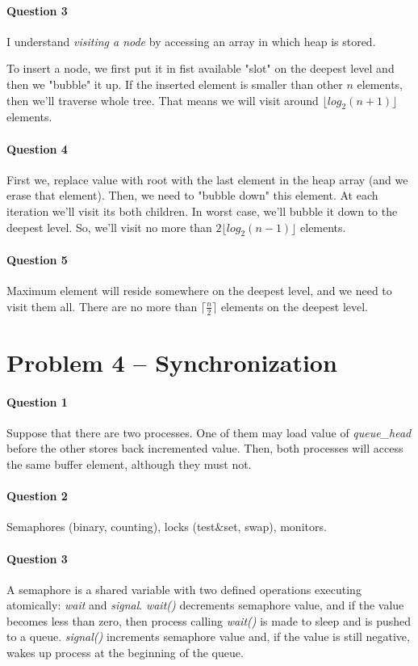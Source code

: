 \paragraph{Question 3}
I understand \textit{visiting a node} by accessing an array in which heap is stored.

To insert a node, we first put it in fist available "slot" on the deepest level and then we "bubble" it up.
If the inserted element is smaller than other $n$ elements, then we'll traverse whole tree.
That means we will visit around $\lfloor log_2 (n+1)\rfloor$ elements.

\paragraph{Question 4}
First we, replace value with root with the last element in the heap array (and we erase that element).
Then, we need to "bubble down" this element.
At each iteration we'll visit its both children.
In worst case, we'll bubble it down to the deepest level.
So, we'll visit no more than $2 \lfloor log_2 (n-1) \rfloor$ elements.

\paragraph{Question 5}
Maximum element will reside somewhere on the deepest level, and we need to visit them all.
There are no more than $\lceil \frac{n}{2} \rceil$ elements on the deepest level.



\section{Problem 4 – Synchronization}

\paragraph{Question 1}
Suppose that there are two processes.
One of them may load value of \emph{queue\_head} before the other stores back incremented value.
Then, both processes will access the same buffer element, although they must not.

\paragraph{Question 2}
Semaphores (binary, counting), locks (test\&set, swap), monitors.


\paragraph{Question 3}
A semaphore is a shared variable with two defined operations executing atomically:
\emph{wait} and \emph{signal}.
\emph{wait()} decrements semaphore value, and if the value becomes less than zero, then process calling \emph{wait()} is made to sleep and is pushed to a queue.
\emph{signal()} increments semaphore value and, if the value is still negative, wakes up process at the beginning of the queue.

